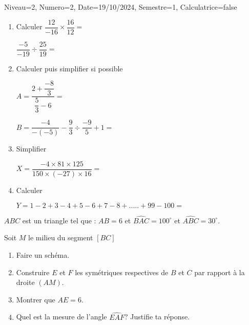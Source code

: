 \documentclass[a4paper,12pt]{article}
\begin{document}
\begin{Maquette}[DS]{Niveau=2, Numero=2, Date=19/10/2024, Semestre=1, Calculatrice=false}


\begin{exercice}
\begin{enumerate}
\item Calculer 
$\dfrac{12}{-16}\times \dfrac{16}{12}=$\anserline[1]

$\dfrac{-5}{-19}\div \dfrac{25}{19}=$\anserline[1]

\item Calculer puis simplifier si possible

$A=\dfrac{2+\dfrac{-8}{3}}{\dfrac{5}{3}-6}=$\anserline[2]

$B=\dfrac{-4}{-(-5)}-\dfrac{9}{3}\div\dfrac{-9}{5}+1 =$\anserline[2]

\item Simplifier 

$X=\dfrac{-4\times 81\times 125}{150\times (-27)\times 16}=$\anserline[3]

\item Calculer

$Y=1-2+3-4+5-6+7-8+.....+99-100=$\anserline[4]
\end{enumerate}
\end{exercice}

\begin{exercice}
$ABC$ est un triangle tel que : $AB=6$ et $\widehat{BAC}=100^{\circ}$ et $\widehat{ABC}=30^{\circ}$.

Soit $M$ le milieu du segment $[BC]$ 
\begin{enumerate}
\item Faire un schéma.
\item Construire $E$ et $F$ les symétriques respectives   de $B$ et $C$ par rapport à la droite $(AM)$.
\item Montrer que $AE=6$.
\item Quel est la mesure de l'angle $\widehat{EAF}$? Justifie ta réponse.
\end{enumerate}
\end{exercice}


\end{Maquette}
\end{document}
